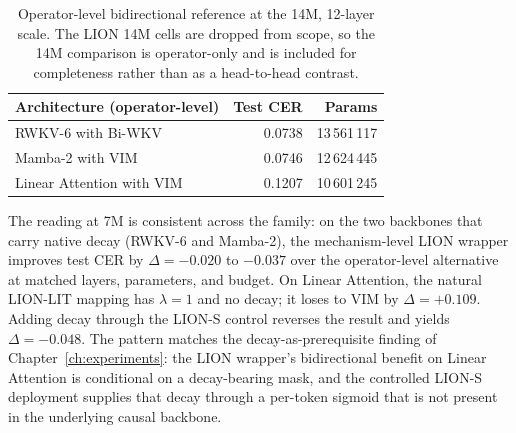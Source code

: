 \begin{table}[!htbp]
\centering
\small
\caption[Operator-level bidirectional reference at 14M]{Operator-level
bidirectional reference at the 14M, 12-layer scale. The LION 14M
cells are dropped from scope, so the 14M comparison is operator-only
and is included for completeness rather than as a head-to-head
contrast.}
\label{tab:results:bidirectional-comparison-14m}
\setlength{\tabcolsep}{6pt}
\renewcommand{\arraystretch}{1.15}
\begin{tabularx}{\linewidth}{@{}X r r@{}}
\toprule
\textbf{Architecture (operator-level)} & \textbf{Test CER} & \textbf{Params} \\
\midrule
RWKV-6 with Bi-WKV       & 0.0738 & 13\,561\,117 \\
Mamba-2 with VIM         & 0.0746 & 12\,624\,445 \\
Linear Attention with VIM & 0.1207 & 10\,601\,245 \\
\bottomrule
\end{tabularx}
\end{table}

The reading at 7M is consistent across the family: on the two
backbones that carry native decay (RWKV-6 and Mamba-2), the
mechanism-level LION wrapper improves test CER by
$\Delta = -0.020$ to $-0.037$ over the operator-level alternative
at matched layers, parameters, and budget. On Linear Attention,
the natural LION-LIT mapping has $\lambda = 1$ and no decay; it
loses to VIM by $\Delta = +0.109$. Adding decay through the
LION-S control reverses the result and yields $\Delta = -0.048$.
The pattern matches the decay-as-prerequisite finding of
Chapter~\ref{ch:experiments}: the LION wrapper's bidirectional
benefit on Linear Attention is conditional on a decay-bearing mask,
and the controlled LION-S deployment supplies that decay through a
per-token sigmoid that is not present in the underlying causal
backbone.
